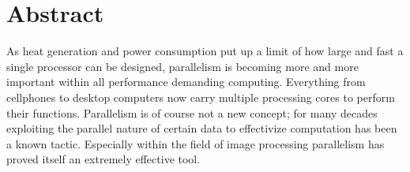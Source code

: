 \begingroup
\let\clearpage\relax
\let\cleardoublepage\relax
\let\cleardoublepage\relax

\chapter*{Abstract}




As heat generation and power consumption put up a limit of how large and fast a
single processor can be designed, parallelism is becoming more and more
important within all performance demanding computing. Everything from cellphones
to desktop computers now carry multiple processing cores to perform their
functions. Parallelism is of course not a new concept; for many decades
exploiting the parallel nature of certain data to effectivize computation has
been a known tactic. Especially within the field of image processing parallelism
has proved itself an extremely effective tool.

